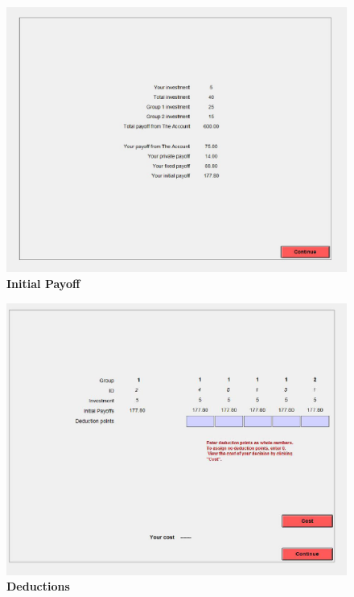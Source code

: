 \documentclass[12pt]{article}
\begin{document}
\centering
\begin{figure}[H]
\includegraphics[width=40pc]{initialpayoff_edit}
\caption*{\bf Initial Payoff}
\end{figure}

\newpage

\centering
\begin{figure}[H]
\includegraphics[width=40pc]{deductionsPM}
\caption*{\bf Deductions}
\end{figure}

\newpage
\end{document}
